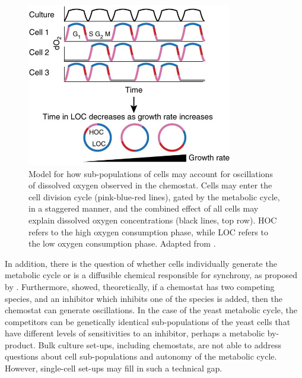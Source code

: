 \begin{figure}[htbp!]
  \centering
  \includegraphics[width=0.8\textwidth]{mellorMolecularBasisMetabolic2016_3b_adapted}
  \caption[
    Model for how sub-populations of cells may account for oscillations of dissolved oxygen observed in the chemostat
  ]{
    Model for how sub-populations of cells may account for oscillations of dissolved oxygen observed in the chemostat.
    Cells may enter the cell division cycle (pink-blue-red lines), gated by the metabolic cycle, in a staggered manner, and the combined effect of all cells may explain dissolved oxygen concentrations (black lines, top row).
    HOC refers to the high oxygen consumption phase, while LOC refers to the low oxygen consumption phase.
    Adapted from \textcite{mellorMolecularBasisMetabolic2016}.}
  \label{fig:intro-ymc-populations}
\end{figure}

In addition, there is the question of whether cells individually generate the metabolic cycle or is a diffusible chemical responsible for synchrony, as proposed by \textcite{krishnaMinimalPushPull2018}.
Furthermore, \textcite{smithTheoryChemostatDynamics1995} showed, theoretically, if a chemostat has two competing species, and an inhibitor which inhibits one of the species is added, then the chemostat can generate oscillations.
In the case of the yeast metabolic cycle, the competitors can be genetically identical sub-populations of the yeast cells that have different levels of sensitivities to an inhibitor, perhaps a metabolic by-product.
Bulk culture set-ups, including chemostats, are not able to address questions about cell sub-populations and autonomy of the metabolic cycle.
However, single-cell set-ups may fill in such a technical gap.

